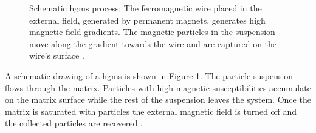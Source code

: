
\begin{figure}[h]
\centering

\caption[Schematic \gls{hgms} process]{Schematic \gls{hgms} process: The ferromagnetic wire placed in the external field, generated by permanent magnets, generates high magnetic field gradients. The magnetic particles in the suspension move along the gradient towards the wire and are captured on the wire's surface \cite{FranzrebHabil}.  
\label{fig:hgms}
}
\end{figure}

A schematic drawing of a \gls{hgms} is shown in Figure \ref{fig:hgms}. The particle suspension flows through the matrix. Particles with high magnetic susceptibilities accumulate on the matrix surface while the rest of the suspension leaves the system. Once the matrix is saturated with particles the external magnetic field is turned off and the collected particles are recovered \cite{svoboda2004magnetic}\cite{gerber1983high}\cite{ditsch2005high}.    

